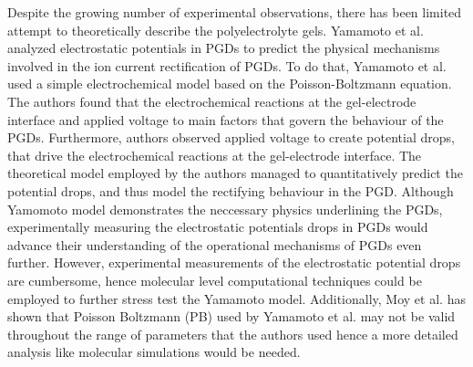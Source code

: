 \documentclass[twoside,twocolumn,9pt]{article}
\begin{document}


 Despite the growing number of experimental observations, there has been limited attempt to theoretically describe the polyelectrolyte gels\cite{Yamamoto2014ElectrochemicalDiodes}. Yamamoto et al.  \cite{Yamamoto2014ElectrochemicalDiodes}  analyzed electrostatic potentials in PGDs to predict the physical mechanisms involved in the ion current rectification of PGDs. To do that, Yamamoto et al. used a simple electrochemical model based on the Poisson-Boltzmann equation.  The authors found that the electrochemical reactions at the gel-electrode interface and applied voltage to main factors that govern the behaviour of the PGDs. Furthermore, authors observed applied voltage to create potential drops, that drive the electrochemical reactions at the gel-electrode interface. The theoretical model employed by the authors managed to quantitatively predict the potential drops, and thus model the rectifying behaviour in the PGD. Although Yamomoto model demonstrates the neccessary physics underlining the PGDs, experimentally measuring the electrostatic potentials drops in PGDs would advance their understanding of the operational mechanisms of PGDs even further. However, experimental measurements of the electrostatic potential drops are cumbersome, hence molecular level computational techniques could be employed to further stress test the Yamamoto model. Additionally, Moy et al.\cite{Moy2000TestsDynamics} has shown that Poisson Boltzmann (PB) used by  Yamamoto et al.\cite{Yamamoto2014ElectrochemicalDiodes} may not be valid throughout the range of parameters that the authors used hence a more detailed analysis like molecular simulations would be needed.
\end{document}
